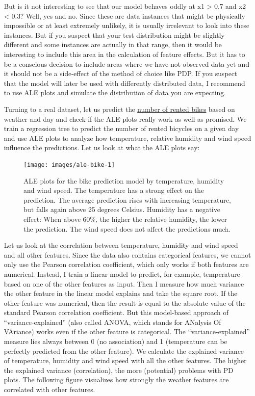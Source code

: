 \documentclass[
  12pt,
]{krantz}
\begin{document}
But is it not interesting to see that our model behaves oddly at x1 \textgreater{} 0.7 and x2 \textless{} 0.3?
Well, yes and no.
Since these are data instances that might be physically impossible or at least extremely unlikely, it is usually irrelevant to look into these instances.
But if you suspect that your test distribution might be slightly different and some instances are actually in that range, then it would be interesting to include this area in the calculation of feature effects.
But it has to be a conscious decision to include areas where we have not observed data yet and it should not be a side-effect of the method of choice like PDP.
If you suspect that the model will later be used with differently distributed data, I recommend to use ALE plots and simulate the distribution of data you are expecting.

Turning to a real dataset, let us predict the \protect\hyperlink{bike-data}{number of rented bikes} based on weather and day and check if the ALE plots really work as well as promised.
We train a regression tree to predict the number of rented bicycles on a given day and use ALE plots to analyze how temperature, relative humidity and wind speed influence the predictions.
Let us look at what the ALE plots say:

\begin{figure}

{\centering \texttt{[image: images/ale-bike-1]} 

}

\caption{ALE plots for the bike prediction model by temperature, humidity and wind speed. The temperature has a strong effect on the prediction. The average prediction rises with increasing temperature, but falls again above 25 degrees Celsius. Humidity has a negative effect: When above 60\%, the higher the relative humidity, the lower the prediction. The wind speed does not affect the predictions much.}\label{fig:ale-bike}
\end{figure}

Let us look at the correlation between temperature, humidity and wind speed and all other features.
Since the data also contains categorical features, we cannot only use the Pearson correlation coefficient, which only works if both features are numerical.
Instead, I train a linear model to predict, for example, temperature based on one of the other features as input.
Then I measure how much variance the other feature in the linear model explains and take the square root.
If the other feature was numerical, then the result is equal to the absolute value of the standard Pearson correlation coefficient.
But this model-based approach of ``variance-explained'' (also called ANOVA, which stands for ANalysis Of VAriance) works even if the other feature is categorical.
The ``variance-explained'' measure lies always between 0 (no association) and 1 (temperature can be perfectly predicted from the other feature).
We calculate the explained variance of temperature, humidity and wind speed with all the other features.
The higher the explained variance (correlation), the more (potential) problems with PD plots.
The following figure visualizes how strongly the weather features are correlated with other features.
\end{document}
